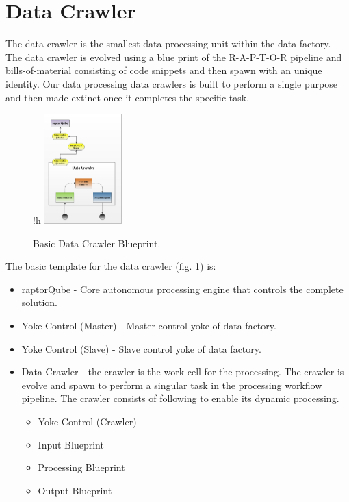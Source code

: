 \section{Data Crawler}

The data crawler is the smallest data processing unit within the data factory. The data crawler is evolved using a blue print of the R-A-P-T-O-R pipeline and bills-of-material consisting of code snippets and then spawn with an unique identity. Our data processing data crawlers is built to perform a single purpose and then made extinct once it completes the specific task.

\begin{figure}{!h}
    \includegraphics[width=3cm]{images/DataCrawler.png}
    \caption{Basic Data Crawler Blueprint.} \label{fig:datacrawler}
\end{figure}

The basic template for the data crawler (fig. \ref{fig:datacrawler}) is:

\begin{itemize}
    \item raptorQube - Core autonomous processing engine that controls the complete solution.
    \item Yoke Control (Master) - Master control yoke of data factory.
    \item Yoke Control (Slave) - Slave control yoke of data factory.
    \item Data Crawler - the crawler is the work cell for the processing.
    The crawler is evolve and spawn to perform a singular task in the processing workflow pipeline.
    The crawler consists of following to enable its dynamic processing.
    \begin{itemize}
        \item Yoke Control (Crawler)
        \item Input Blueprint
        \item Processing Blueprint
        \item Output Blueprint
    \end{itemize}
\end{itemize}

